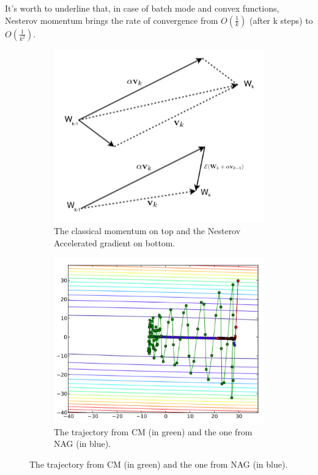 			It's worth to underline that, in case of batch mode and convex functions, Nesterov momentum brings the rate of convergence from $O(\frac{1}{k})$ (after k steps) to $O(\frac{1}{k^2})$\cite{10029946121}. %
			\begin{figure}
			\centering
				\begin{subfigure}[b]{0.4\textwidth}
					\includegraphics[width=\textwidth]{img/figures/momentum}
			  		\caption{The classical momentum on top and the Nesterov Accelerated gradient on bottom.}
				\label{fig:momentum}
				\end{subfigure}
				\qquad
				\begin{subfigure}[b]{0.4\textwidth}
					\includegraphics[width=\textwidth]{img/figures/momentum_graph}
				    \caption{The trajectory from CM (in green) and the one from NAG (in blue).}
				\label{fig:momentum_graph}
				\end{subfigure}
			\end{figure}


